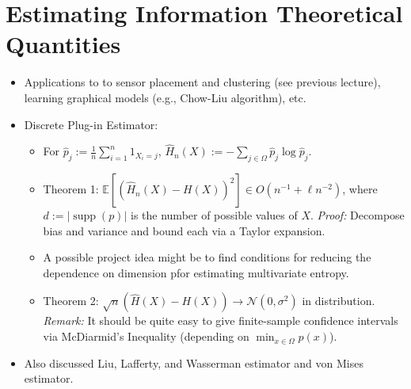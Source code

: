 \documentclass{article}
\newcommand{\inv}{^{-1}}                            %
\newcommand{\E}{\mathbb{E}}                         %
\newcommand{\supp}{\operatorname{supp}}             %
\begin{document}
\section{Estimating Information Theoretical Quantities}
\begin{itemize}
\item Applications to to sensor placement and clustering (see previous
lecture), learning graphical models (e.g., Chow-Liu algorithm), etc.
\item Discrete Plug-in Estimator:
\begin{itemize}
\item For $\hat p_j := \frac1n \sum_{i = 1}^n 1_{X_i = j}$,
$\hat H_n(X) := -\sum_{j \in \Omega} \hat p_j \log \hat p_j$.
\item Theorem 1:
$\E\left[ (\hat H_n(X) - H(X))^2 \right] \in O(n\inv + \ell n^{-2})$, where
$d := |\supp(p)|$ is the number of possible values of $X$.
\emph{Proof:} Decompose bias and variance and bound each via a Taylor
expansion.
\item A possible project idea might be to find conditions for reducing the
dependence on dimension pfor estimating multivariate entropy.
\item Theorem 2: $\sqrt{n}(\hat H(X) - H(X)) \to \mathcal{N}(0,\sigma^2)$ in
distribution. \emph{Remark:} It should be quite easy to give finite-sample
confidence intervals via McDiarmid's Inequality (depending on
$\min_{x \in \Omega} p(x)$).
\end{itemize}
\item Also discussed Liu, Lafferty, and Wasserman estimator and von Mises
estimator.
\end{itemize}
\end{document}
